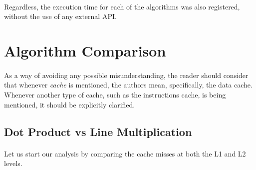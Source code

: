 \documentclass{report}
\begin{document}
			\paragraph{}Regardless, the execution time for each of the algorithms was also registered, without the use of any external API.
			
		\section{Algorithm Comparison}
		
			\paragraph{}As a way of avoiding any possible misunderstanding, the reader should consider that whenever \emph{cache} is mentioned, the authors mean, specifically, the data cache. Whenever another type of cache, such as the instructions cache, is being mentioned, it should be explicitly clarified.
		
			\subsection{Dot Product vs Line Multiplication}
			
				\paragraph{}Let us start our analysis by comparing the cache misses at both the L1 and L2 levels.
			
\end{document}
